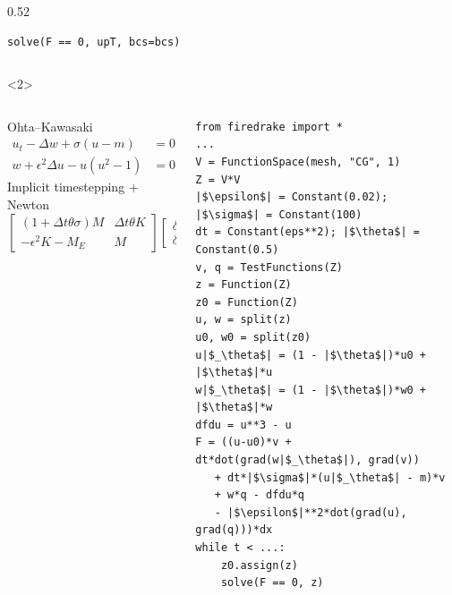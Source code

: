 \documentclass[presentation,aspectratio=43, 10pt]{beamer}
\begin{document}
\begin{frame}[fragile,t]
\begin{onlyenv}
\begin{columns}[T]
\begin{column}{0.52\framewidth}
\begin{verbatim}
solve(F == 0, upT, bcs=bcs)
\end{verbatim}
      \end{column}
    \end{columns}
  \end{onlyenv}
  \begin{onlyenv}<2>
    \begin{columns}[T]
      \begin{column}{0.47\textwidth}
        \begin{block}{Ohta--Kawasaki}
          \small
          \begin{align*}
            u_t - \Delta w + \sigma(u - m) &= 0\\
            w + \epsilon^2 \Delta u - u(u^2 - 1) &= 0
          \end{align*}
          Implicit timestepping + Newton
          \begin{equation*}
            \begin{bmatrix}
              (1 + \Delta t \theta \sigma)M  & \Delta t\theta K \\
              -\epsilon^2 K - M_E & M
            \end{bmatrix}
            \begin{bmatrix}
              \delta u \\
              \delta w
            \end{bmatrix} =
            \begin{bmatrix}
              f_1 \\
              f_2
            \end{bmatrix}
          \end{equation*}
        \end{block}
      \end{column}
      \begin{column}{0.52\textwidth}
\begin{verbatim}
from firedrake import *
...
V = FunctionSpace(mesh, "CG", 1)
Z = V*V
|$\epsilon$| = Constant(0.02);    |$\sigma$| = Constant(100)
dt = Constant(eps**2); |$\theta$| = Constant(0.5)
v, q = TestFunctions(Z)
z = Function(Z)
z0 = Function(Z)
u, w = split(z)
u0, w0 = split(z0)
u|$_\theta$| = (1 - |$\theta$|)*u0 + |$\theta$|*u
w|$_\theta$| = (1 - |$\theta$|)*w0 + |$\theta$|*w
dfdu = u**3 - u
F = ((u-u0)*v + dt*dot(grad(w|$_\theta$|), grad(v))
   + dt*|$\sigma$|*(u|$_\theta$| - m)*v
   + w*q - dfdu*q
   - |$\epsilon$|**2*dot(grad(u), grad(q)))*dx
while t < ...:
    z0.assign(z)
    solve(F == 0, z)
\end{verbatim}
      \end{column}
    \end{columns}
  \end{onlyenv}
\end{frame}
\end{document}
